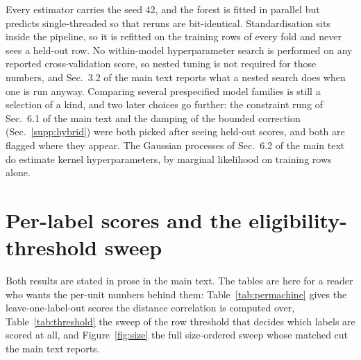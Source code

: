 \documentclass[12pt,letterpaper]{article}
\begin{document}
Every estimator carries the seed 42, and the forest is fitted in parallel but
predicts single-threaded so that reruns are bit-identical. Standardisation sits
inside the pipeline, so it is refitted on the training rows of every fold and
never sees a held-out row. No within-model hyperparameter search is performed on
any reported cross-validation score, so nested tuning is not required for those
numbers, and Sec.~3.2 of the main text reports what a nested search does when
one is run anyway.
Comparing several prespecified model families is still a selection of a kind,
and two later choices go further: the constraint rung of
Sec.~6.1 of the main text and the damping of the bounded correction
(Sec.~\ref{supp:hybrid}) were both
picked after seeing held-out scores, and both are flagged where they appear.
The Gaussian processes of Sec.~6.2 of the main text do estimate kernel hyperparameters,
by marginal likelihood on training rows alone.

\section{Per-label scores and the eligibility-threshold sweep}
\label{supp:permachine}

Both results are stated in prose in the main text. The tables are here for a
reader who wants the per-unit numbers behind them:
Table~\ref{tab:permachine} gives the leave-one-label-out scores the distance
correlation is computed over, Table~\ref{tab:threshold} the sweep of the row
threshold that decides which labels are scored at all, and
Figure~\ref{fig:size} the full size-ordered sweep whose matched cut the main
text reports.
\end{document}
